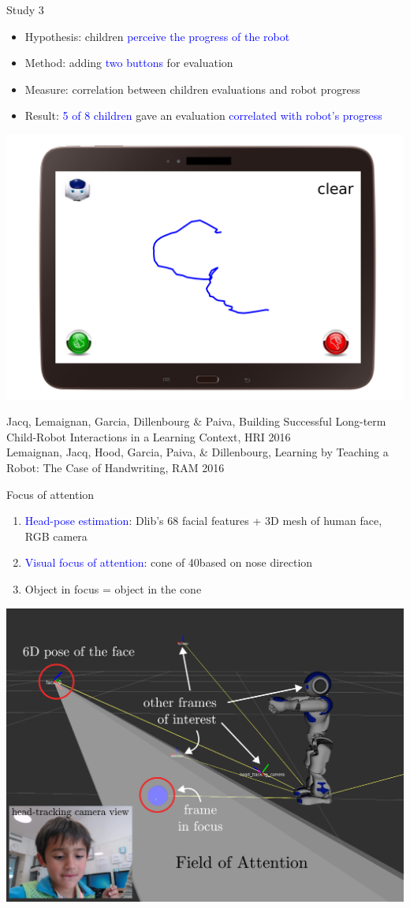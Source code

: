 \documentclass[compress]{beamer}
\renewcommand{\bf}{\Medium}
\begin{document}
\begin{frame}{Study 3}
    \begin{itemize}
    \item {\bf Hypothesis}: children \textcolor{blue}{perceive the progress of the robot}
    \item {\bf Method}: adding \textcolor{blue}{two buttons} for evaluation 
    \item {\bf Measure}: correlation between children evaluations and robot progress
    \item {\bf Result}: \textcolor{blue}{5 of 8 children} gave an evaluation \textcolor{blue}{correlated with robot's progress}
    \end{itemize}
    \centering
    \includegraphics[width=0.35\columnwidth]{normandy_tablet}    

\begin{flushleft}
\tiny{Jacq, Lemaignan, Garcia, Dillenbourg \& Paiva, {\bf Building Successful Long-term Child-Robot Interactions in a Learning Context}, HRI 2016}\\
\tiny{Lemaignan, Jacq, Hood, Garcia, Paiva, \& Dillenbourg, {\bf Learning by Teaching a Robot: The Case of Handwriting}, RAM 2016}
\end{flushleft}
\end{frame}

\begin{frame}{Focus of attention}
    \begin{enumerate}
    \item \textcolor{blue}{Head-pose estimation}: Dlib's 68 facial features + 3D mesh of human face, RGB camera
    \item \textcolor{blue}{Visual focus of attention}: cone of 40\degree based on nose direction
    \item Object in focus = object in the cone
    \end{enumerate}
    \centering
    \includegraphics[width=0.4\columnwidth]{field_of_attention}
\end{frame}
\end{document}

